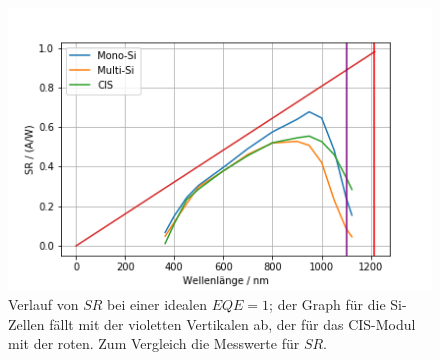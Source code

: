 \begin{figure}[ht]
    \centering
    \includegraphics[scale=0.75]{Bilder/32idealEQEverb.png}
    \caption{Verlauf von $SR$ bei einer idealen $EQE = 1$; der Graph für die Si-Zellen fällt mit der violetten Vertikalen ab, der für
    das CIS-Modul mit der roten. Zum Vergleich die Messwerte für $SR$.}
    \label{bild:idealEQEverb}
\end{figure}
 
\newpage